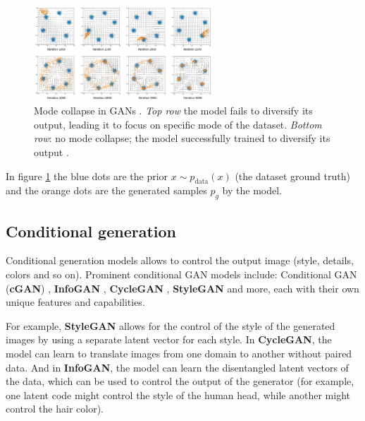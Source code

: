 \begin{figure}
    \centering
    \includegraphics[width=0.6\textwidth]{images/gan/gan_mode_collapse.png}
    \caption{Mode collapse in GANs \cite{gan_mode_collapse_image_source}. \textit{Top row} the model fails to diversify its output, leading it to focus on specific mode of the dataset. \textit{Bottom row}: no mode collapse; the model successfully trained to diversify its output \cite{gan_mode_collapse_image_source}.}
    \label{fig:gan_mode_collapse}
\end{figure}

In figure \ref{fig:gan_mode_collapse} the blue dots are the prior $x \sim p_{\text{data}}(x)$ (the dataset ground truth) and the orange dots are the generated samples $p_g$ by the model.




\subsection{Conditional generation}
\label{subsec:gan_conditional_generation}

Conditional generation models allows to control the output image (style, details, colors and so on). Prominent conditional GAN models include: Conditional GAN (\textbf{cGAN}) \cite{cgan}, \textbf{InfoGAN} \cite{infogan}, \textbf{CycleGAN} \cite{cyclegan}, \textbf{StyleGAN} \cite{stylegan} and more, each with their own unique features and capabilities. 

For example, \textbf{StyleGAN} allows for the control of the style of the generated images by using a separate latent vector for each style. In \textbf{CycleGAN}, the model can learn to translate images from one domain to another without paired data. And in \textbf{InfoGAN}, the model can learn the disentangled latent vectors of the data, which can be used to control the output of the generator (for example, one latent code might control the style of the human head, while another might control the hair color).

